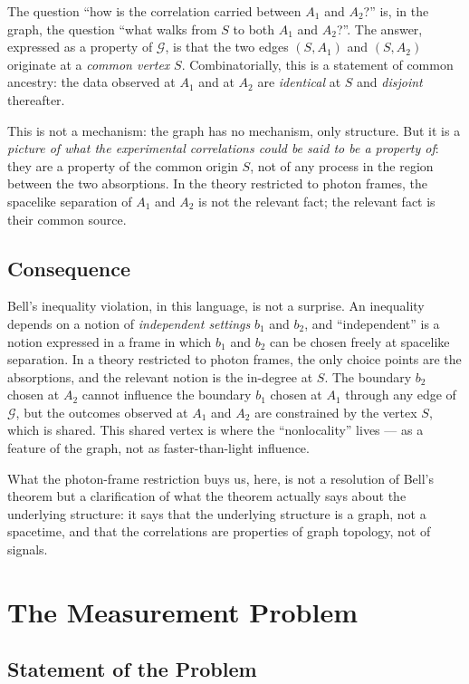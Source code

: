 \documentclass[11pt]{article}
\begin{document}
The question ``how is the correlation carried between $A_1$ and $A_2$?'' is, in the graph, the question ``what walks from $S$ to both $A_1$ and $A_2$?''. The answer, expressed as a property of $\mathcal{G}$, is that the two edges $(S, A_1)$ and $(S, A_2)$ originate at a \emph{common vertex} $S$. Combinatorially, this is a statement of common ancestry: the data observed at $A_1$ and at $A_2$ are \emph{identical} at $S$ and \emph{disjoint} thereafter.

This is not a mechanism: the graph has no mechanism, only structure. But it is a \emph{picture of what the experimental correlations could be said to be a property of}: they are a property of the common origin $S$, not of any process in the region between the two absorptions. In the theory restricted to photon frames, the spacelike separation of $A_1$ and $A_2$ is not the relevant fact; the relevant fact is their common source.

\subsection{Consequence}

Bell's inequality violation, in this language, is not a surprise. An inequality depends on a notion of \emph{independent settings} $b_1$ and $b_2$, and ``independent'' is a notion expressed in a frame in which $b_1$ and $b_2$ can be chosen freely at spacelike separation. In a theory restricted to photon frames, the only choice points are the absorptions, and the relevant notion is the in-degree at $S$. The boundary $b_2$ chosen at $A_2$ cannot influence the boundary $b_1$ chosen at $A_1$ through any edge of $\mathcal{G}$, but the outcomes observed at $A_1$ and $A_2$ are constrained by the vertex $S$, which is shared. This shared vertex is where the ``nonlocality'' lives --- as a feature of the graph, not as faster-than-light influence.

What the photon-frame restriction buys us, here, is not a resolution of Bell's theorem but a clarification of what the theorem actually says about the underlying structure: it says that the underlying structure is a graph, not a spacetime, and that the correlations are properties of graph topology, not of signals.

\section{The Measurement Problem}
\label{sec:measurement}

\subsection{Statement of the Problem}
\end{document}

